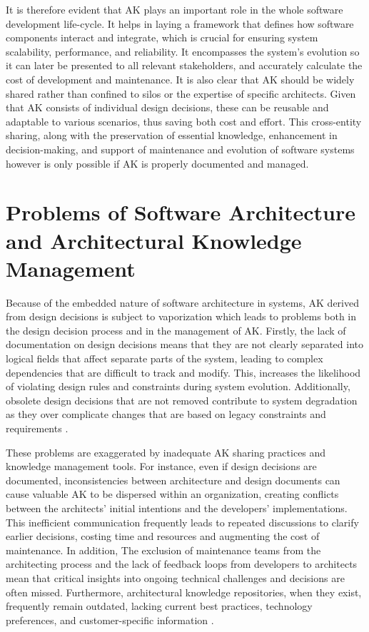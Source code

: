        It is therefore evident that AK plays an important role in the whole software development life-cycle. It helps in laying a framework that defines how software components interact and integrate, which is crucial for ensuring system scalability, performance, and reliability. It encompasses the system's evolution so it can later be presented to all relevant stakeholders, and accurately calculate the cost of development and maintenance. It is also clear that AK should be widely shared rather than confined to silos or the expertise of specific architects. Given that AK consists of individual design decisions, these can be reusable and adaptable to various scenarios, thus saving both cost and effort. This cross-entity sharing, along with the preservation of essential knowledge, enhancement in decision-making, and support of maintenance and evolution of software systems \cite{Architecture-reasoning} however is only possible if AK is properly documented and managed.

    \section{Problems of Software Architecture and Architectural Knowledge Management}
        Because of the embedded nature of software architecture in systems, AK derived from design decisions is subject to vaporization which leads to problems both in the design decision process and in the management of AK. Firstly, the lack of documentation on design decisions means that they are not clearly separated into logical fields that affect separate parts of the system, leading to complex dependencies that are difficult to track and modify. This, increases the likelihood of violating design rules and constraints during system evolution. Additionally, obsolete design decisions that are not removed contribute to system degradation as they over complicate changes that are based on legacy constraints and requirements \cite{Arch+DesignDescisions}.
        
        These problems are exaggerated by inadequate AK sharing practices and knowledge management tools. For instance, even if design decisions are documented, inconsistencies between architecture and design documents can cause valuable AK to be dispersed within an organization, creating conflicts between the architects' initial intentions and the developers' implementations. This inefficient communication frequently leads to repeated discussions to clarify earlier decisions, costing time and resources and augmenting the cost of maintenance. In addition, The exclusion of maintenance teams from the architecting process and the lack of feedback loops from developers to architects mean that critical insights into ongoing technical challenges and decisions are often missed. Furthermore, architectural knowledge repositories, when they exist, frequently remain outdated, lacking current best practices, technology preferences, and customer-specific information \cite{ARCHITECTURAL_KNOWLEDGE_SHARING_(AKS)}.
        
